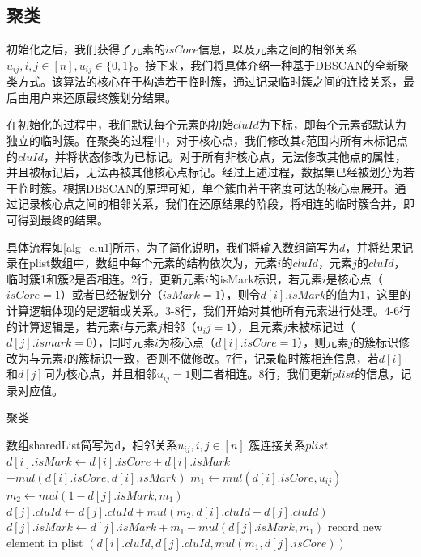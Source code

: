 \subsection{聚类}
\label{t1-julei}
初始化之后，我们获得了元素的$ isCore $信息，以及元素之间的相邻关系$ u_{ij},i,j\in[n],u_{ij}\in\{0,1\} $。接下来，我们将具体介绍一种基于DBSCAN的全新聚类方式。该算法的核心在于构造若干临时簇，通过记录临时簇之间的连接关系，最后由用户来还原最终簇划分结果。

在初始化的过程中，我们默认每个元素的初始$ cluId $为下标，即每个元素都默认为独立的临时簇。在聚类的过程中，对于核心点，我们修改其$ \epsilon $范围内所有未标记点的$ cluId $，并将状态修改为已标记。对于所有非核心点，无法修改其他点的属性，并且被标记后，无法再被其他核心点标记。经过上述过程，数据集已经被划分为若干临时簇。根据DBSCAN的原理可知，单个簇由若干密度可达的核心点展开。通过记录核心点之间的相邻关系，我们在还原结果的阶段，将相连的临时簇合并，即可得到最终的结果。

具体流程如\ref{alg_clu1}所示，为了简化说明，我们将输入数组简写为$ d $，并将结果记录在plist数组中，数组中每个元素的结构依次为，元素$ i $的$ cluId $，元素$ j $的$ cluId $，临时簇1和簇2是否相连。2行，更新元素$i$的isMark标识，若元素$i$是核心点（$isCore=1$）或者已经被划分（$isMark=1$），则令$ d[i].isMark $的值为$ 1 $，这里的计算逻辑体现的是逻辑或关系。3-8行，我们开始对其他所有元素进行处理。4-6行的计算逻辑是，若元素$ i $与元素$ j $相邻（$ u_ij = 1 $），且元素$ j $未被标记过（$ d[j].ismark=0 $），同时元素$ i $为核心点（$ d[i].isCore =1 $），则元素$ j $的簇标识修改为与元素$ i $的簇标识一致，否则不做修改。7行，记录临时簇相连信息，若$ d[i] $和$ d[j] $同为核心点，并且相邻$ u_{ij}=1 $则二者相连。8行，我们更新$ plist $的信息，记录对应值。

\begin{algorithm}[htbp]
	\renewcommand{\algorithmicrequire}{\textbf{输入:}}
	\renewcommand{\algorithmicensure}{\textbf{输出:}}
	\caption{聚类}
	\label{alg_clu1}
	\begin{algorithmic}[1]
		\REQUIRE 数组sharedList简写为d，相邻关系$ u_{ij},i,j\in[n] $
		\ENSURE 簇连接关系$ plist $
		\STATE $d[i].isMark\leftarrow d[i].isCore+d[i].isMark$\\ $-mul(d[i].isCore,d[i].isMark)$
		\STATE $ m_1 \leftarrow mul(d[i].isCore, u_{ij}) $
		\STATE $ m_2 \leftarrow mul(1-d[j].isMark, m_1) $
		\STATE $ d[j].cluId \leftarrow d[j].cluId + mul(m_2, d[i].cluId - d[j].cluId)$
		\STATE $ d[j].isMark \leftarrow d[j].isMark+m_1 - mul(d[j].isMark, m_1) $
		\STATE record new element in plist $ (d[i].cluId, d[j].cluId, mul(m_1, d[j].isCore)) $
		\ENDFOR
		\ENDFOR
	\end{algorithmic}
\end{algorithm}

